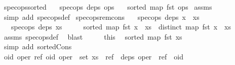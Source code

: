 \begin{isabellebody}
\isanewline
{}\isamarkupfalse%
\ spec{\isacharunderscore}ops{\isacharunderscore}sorted{\isacharcolon}\isanewline
\ \ \ {\isachardoublequoteopen}spec{\isacharunderscore}ops\ deps\ ops{\isachardoublequoteclose}\isanewline
\ \ \ {\isachardoublequoteopen}sorted\ {\isacharparenleft}map\ fst\ ops{\isacharparenright}{\isachardoublequoteclose}\isanewline
%
\isadelimproof
%
\endisadelimproof
%
\isatagproof
{}\isamarkupfalse%
\ assms\ \isamarkupfalse%
\ {\isacharparenleft}simp\ add{\isacharcolon}\ spec{\isacharunderscore}ops{\isacharunderscore}def{\isacharparenright}%
\endisatagproof
{\isafoldproof}%
%
\isadelimproof
\isanewline
%
\endisadelimproof
\isanewline
{}\isamarkupfalse%
\ spec{\isacharunderscore}ops{\isacharunderscore}rem{\isacharunderscore}cons{\isacharcolon}\isanewline
\ \ \ {\isachardoublequoteopen}spec{\isacharunderscore}ops\ deps\ {\isacharparenleft}x\ {\isacharhash}\ xs{\isacharparenright}{\isachardoublequoteclose}\isanewline
\ \ \ {\isachardoublequoteopen}spec{\isacharunderscore}ops\ deps\ xs{\isachardoublequoteclose}\isanewline
%
\isadelimproof
%
\endisadelimproof
%
\isatagproof
{}\isamarkupfalse%
\ {\isacharminus}\isanewline
\ \ \isamarkupfalse%
\ {\isachardoublequoteopen}sorted\ {\isacharparenleft}map\ fst\ {\isacharparenleft}x\ {\isacharhash}\ xs{\isacharparenright}{\isacharparenright}{\isachardoublequoteclose}\ \ {\isachardoublequoteopen}distinct\ {\isacharparenleft}map\ fst\ {\isacharparenleft}x\ {\isacharhash}\ xs{\isacharparenright}{\isacharparenright}{\isachardoublequoteclose}\isanewline
\ \ \ \ \isamarkupfalse%
\ assms\ spec{\isacharunderscore}ops{\isacharunderscore}def\ \isamarkupfalse%
\ blast{\isacharplus}\isanewline
\ \ \isamarkupfalse%
\ \isamarkupfalse%
\ this\ \isamarkupfalse%
\ {\isachardoublequoteopen}sorted\ {\isacharparenleft}map\ fst\ xs{\isacharparenright}{\isachardoublequoteclose}\isanewline
\ \ \ \ \isamarkupfalse%
\ {\isacharparenleft}simp\ add{\isacharcolon}\ sorted{\isacharunderscore}Cons{\isacharparenright}\isanewline
\ \ \isamarkupfalse%
\ \isamarkupfalse%
\ {\isachardoublequoteopen}{\isasymforall}oid\ oper\ ref{\isachardot}\ {\isacharparenleft}oid{\isacharcomma}\ oper{\isacharparenright}\ {\isasymin}\ set\ xs\ {\isasymand}\ ref\ {\isasymin}\ deps\ oper\ {\isasymlongrightarrow}\ ref\ {\isacharless}\ oid{\isachardoublequoteclose}\isanewline

\end{isabellebody}

